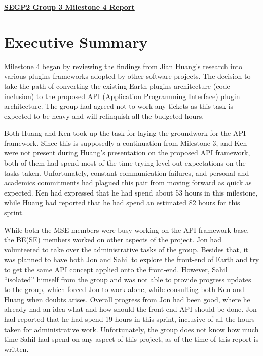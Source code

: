 \documentclass{article}
\begin{document}
\pagestyle{headings}

\begin{center}
{\textbf{\underline{SEGP2 Group 3 Milestone 4 Report}}}
\end{center}


\section*{Executive Summary}

Milestone 4 began by reviewing the findings from Jian Huang's research into various plugins frameworks adopted by other software projects. The decision to take the path of converting the existing Earth plugins architecture (code inclusion) to the proposed API (Application Programming Interface) plugin architecture. The group had agreed not to work any tickets as this task is expected to be heavy and will relinquish all the budgeted hours. 

Both Huang and Ken took up the task for laying the groundwork for the API framework. Since this is supposedly a continuation from Milestone 3, and Ken were not present during Huang's presentation on the proposed API framework, both of them had spend most of the time trying level out expectations on the tasks taken. Unfortunately, constant communication failures, and personal and academics commitments had plagued this pair from moving forward as quick as expected. Ken had expressed that he had spend about 53 hours in this milestone, while Huang had reported that he had spend an estimated 82 hours for this sprint. 

While both the MSE members were busy working on the API framework base, the BE(SE) members worked on other aspects of the project. Jon had volunteered to take over the administrative tasks of the group. Besides that, it was planned to have both Jon and Sahil to explore the front-end of Earth and try to get the same API concept applied onto the front-end. However, Sahil ``isolated'' himself from the group and was not able to provide progress updates to the group, which forced Jon to work alone, while consulting both Ken and Huang when doubts arises. Overall progress from Jon had been good, where he already had an idea what and how should the front-end API should be done. Jon had reported that he had spend 19 hours in this sprint, inclusive of all the hours taken for administrative work. Unfortunately, the group does not know how much time Sahil had spend on any aspect of this project, as of the time of this report is written. 
\end{document}
